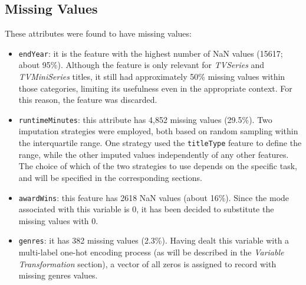 \subsection{Missing Values}
These attributes were found to have missing values:
\begin{itemize}
    \item \texttt{endYear}: it is the feature with the highest number of NaN values (15617; about 95\%).
    Although the feature is only relevant for \textit{TVSeries} and \textit{TVMiniSeries} titles, it still
    had approximately 50\% missing values within those categories, limiting its usefulness even in the
    appropriate context. For this reason, the feature was discarded.
    
    \item \texttt{runtimeMinutes}: this attribute has 4,852 missing values (29.5\%). Two imputation strategies were employed, both based on random sampling within the interquartile range. 
    One strategy used the \texttt{titleType} feature to define the range, while the other imputed values independently of any other features. 
    The choice of which of the two strategies to use depends on the specific task, and will be specified in the corresponding sections.
    
    \item \texttt{awardWins}: this feature has 2618 NaN values (about 16\%).
    Since the mode associated with this variable is 0, it has been decided to substitute the missing
    values with 0.

    \item \texttt{genres}: it has 382 missing values (2.3\%). Having dealt this variable with a
    multi-label one-hot encoding process (as will be described in the \textit{Variable Transformation}
    section), a vector of all zeros is assigned to record with missing genres values.
\end{itemize}



